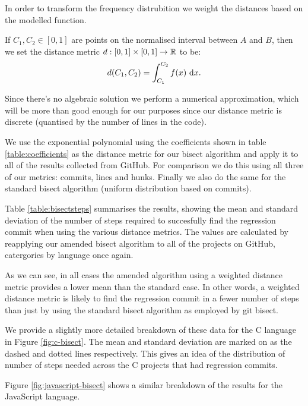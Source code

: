 \documentclass[10pt,journal,compsoc]{IEEEtran}
\begin{document}
In order to transform the frequency distrubition we weight the distances based on the modelled function.

If $C_1, C_2 \in [0, 1]$ are points on the normalised interval between $A$ and $B$, then we set the distance metric $d : [0, 1] \times [ 0, 1 ] \to \mathbb{R}$ to be:
$$
d(C_1, C_2) = \int_{C_1}^{C_2} f(x) \ {\rm d}x .
$$

Since there's no algebraic solution we perform a numerical approximation, which will be more than good enough for our purposes since our distance metric is discrete (quantised by the number of lines in the code).

We use the exponential polynomial using the coefficients shown in table \ref{table:coefficients} as the distance metric for our bisect algorithm and apply it to all of the results collected from GitHub. For comparison we do this using all three of our metrics: commits, lines and hunks. Finally we also do the same for the standard bisect algorithm (uniform distribution based on commits).

Table \ref{table:bisectsteps} summarises the results, showing the mean and standard deviation of the number of steps required to succesfully find the regression commit when using the various distance metrics. The values are calculated by reapplying our amended bisect algorithm to all of the projects on GitHub, catergories by language once again.

As we can see, in all cases the amended algorithm using a weighted distance metric provides a lower mean than the standard case. In other words, a weighted distance metric is likely to find the regression commit in a fewer number of steps than just by using the standard bisect algorithm as employed by {\code git bisect}.

We provide a slightly more detailed breakdown of these data for the C language in Figure \ref{fig:c-bisect}. The mean and standard deviation are marked on as the dashed and dotted lines respectively. This gives an idea of the distribution of number of steps needed across the C projects that had regression commits.

Figure \ref{fig:javascript-bisect} shows a similar breakdown of the results for the JavaScript language.
\end{document}
